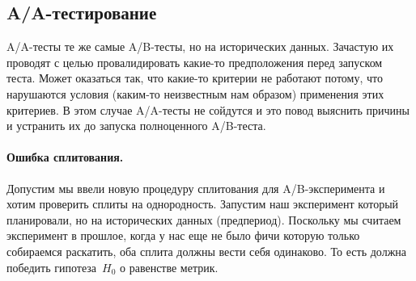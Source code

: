 \documentclass[../handbook.tex]{subfiles}
\begin{document}
\subsection{A/A-тестирование}
A\slash A-тесты те же самые A\slash B-тесты, но на исторических данных.
Зачастую их проводят с целью провалидировать какие-то предположения перед
запуском теста. Может оказаться так, что какие-то критерии не работают потому,
что нарушаются условия (каким-то неизвестным нам образом) применения этих
критериев. В этом случае A/A-тесты не сойдутся и это повод выяснить причины и
устранить их до запуска полноценного A/B-теста.

\paragraph{Ошибка сплитования.}
Допустим мы ввели новую процедуру сплитования для A/B-эксперимента и хотим проверить сплиты на однородность. Запустим наш эксперимент который планировали, но на исторических данных (предпериод). Поскольку мы считаем эксперимент в прошлое, когда у нас еще не было фичи которую только собираемся раскатить, оба сплита должны вести себя одинаково. То есть должна победить гипотеза~$H_0$ о равенстве метрик.
\end{document}

